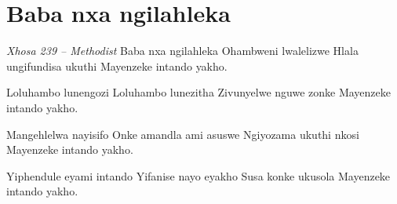 \starttocol
\chapter{Baba nxa ngilahleka}
\nexttocol
\hfill{\it Xhosa 239 -- Methodist}
\stoptocol
\starttocol
\startlines
{\sc Baba} nxa ngilahleka
Ohambweni lwalelizwe
Hlala ungifundisa ukuthi
Mayenzeke intando yakho.

Loluhambo lunengozi
Loluhambo lunezitha
Zivunyelwe nguwe zonke
Mayenzeke intando yakho.

Mangehlelwa nayisifo
Onke amandla ami asuswe
Ngiyozama ukuthi nkosi
Mayenzeke intando yakho.

Yiphendule eyami intando
Yifanise nayo eyakho
Susa konke ukusola
Mayenzeke intando yakho.
\stoplines
\nexttocol

\stoptocol
